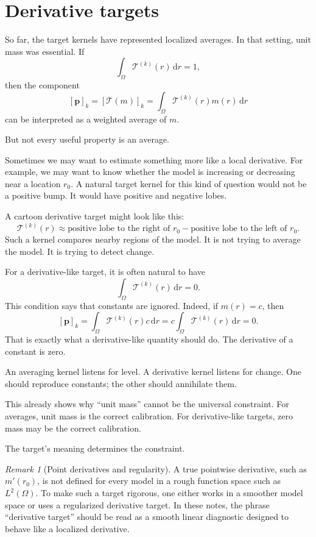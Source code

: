 \documentclass[11pt,openany]{book}
\theoremstyle{definition}
\theoremstyle{remark}
\newtheorem{remark}{Remark}[chapter]
\newcommand{\Tau}{\mathcal{T}}
\newcommand{\dd}{\,\mathrm d}
\begin{document}
\section{Derivative targets}

So far, the target kernels have represented localized averages. In that setting, unit mass was
essential. If
\[
  \int_\Omega \mathcal T^{(k)}(r)\dd r=1,
\]
then the component
\[
  [\mathbf p]_k
  =
  [\Tau(m)]_k
  =
  \int_\Omega \mathcal T^{(k)}(r)m(r)\dd r
\]
can be interpreted as a weighted average of \(m\).

But not every useful property is an average.

Sometimes we may want to estimate something more like a local derivative. For example, we may
want to know whether the model is increasing or decreasing near a location \(r_0\). A natural
target kernel for this kind of question would not be a positive bump. It would have positive and
negative lobes.

A cartoon derivative target might look like this:
\[
  \mathcal T^{(k)}(r)
  \approx
  \text{positive lobe to the right of }r_0
  -
  \text{positive lobe to the left of }r_0.
\]
Such a kernel compares nearby regions of the model. It is not trying to average the model. It is
trying to detect change.

For a derivative-like target, it is often natural to have
\[
  \int_\Omega \mathcal T^{(k)}(r)\dd r=0.
\]
This condition says that constants are ignored. Indeed, if \(m(r)=c\), then
\[
  [\mathbf p]_k
  =
  \int_\Omega \mathcal T^{(k)}(r)c\dd r
  =
  c\int_\Omega \mathcal T^{(k)}(r)\dd r
  =
  0.
\]
That is exactly what a derivative-like quantity should do. The derivative of a constant is zero.

\begin{intuitionbox}
An averaging kernel listens for level. A derivative kernel listens for change. One should
reproduce constants; the other should annihilate them.
\end{intuitionbox}

This already shows why ``unit mass'' cannot be the universal constraint. For averages, unit mass
is the correct calibration. For derivative-like targets, zero mass may be the correct calibration.

The target's meaning determines the constraint.

\begin{remark}[Point derivatives and regularity]
A true pointwise derivative, such as \(m'(r_0)\), is not defined for every model in a rough
function space such as \(L^2(\Omega)\). To make such a target rigorous, one either works in a
smoother model space or uses a regularized derivative target. In these notes, the phrase
``derivative target'' should be read as a smooth linear diagnostic designed to behave like a
localized derivative.
\end{remark}
\end{document}
